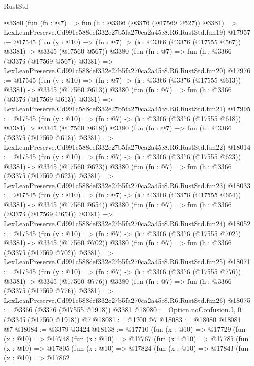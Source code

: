 \begin{lexlean}{RustStd}
\begin{coremodule}
    @3380
    (fun (fn : @7) =>
    fun (h : @3366 (@3376 (@17569 @527)) @3381) =>
    LexLeanPreserve.Cd991c588def332e27b5fa270ca2a45c8.R6.RustStd.fun19)
@17957 := @17545
    (fun (y : @10) => (fn : @7) -> (h : @3366 (@3376 (@17555 @567)) @3381) -> @3345 (@17560 @567))
    @3380
    (fun (fn : @7) =>
    fun (h : @3366 (@3376 (@17569 @567)) @3381) =>
    LexLeanPreserve.Cd991c588def332e27b5fa270ca2a45c8.R6.RustStd.fun20)
@17976 := @17545
    (fun (y : @10) => (fn : @7) -> (h : @3366 (@3376 (@17555 @613)) @3381) -> @3345 (@17560 @613))
    @3380
    (fun (fn : @7) =>
    fun (h : @3366 (@3376 (@17569 @613)) @3381) =>
    LexLeanPreserve.Cd991c588def332e27b5fa270ca2a45c8.R6.RustStd.fun21)
@17995 := @17545
    (fun (y : @10) => (fn : @7) -> (h : @3366 (@3376 (@17555 @618)) @3381) -> @3345 (@17560 @618))
    @3380
    (fun (fn : @7) =>
    fun (h : @3366 (@3376 (@17569 @618)) @3381) =>
    LexLeanPreserve.Cd991c588def332e27b5fa270ca2a45c8.R6.RustStd.fun22)
@18014 := @17545
    (fun (y : @10) => (fn : @7) -> (h : @3366 (@3376 (@17555 @623)) @3381) -> @3345 (@17560 @623))
    @3380
    (fun (fn : @7) =>
    fun (h : @3366 (@3376 (@17569 @623)) @3381) =>
    LexLeanPreserve.Cd991c588def332e27b5fa270ca2a45c8.R6.RustStd.fun23)
@18033 := @17545
    (fun (y : @10) => (fn : @7) -> (h : @3366 (@3376 (@17555 @654)) @3381) -> @3345 (@17560 @654))
    @3380
    (fun (fn : @7) =>
    fun (h : @3366 (@3376 (@17569 @654)) @3381) =>
    LexLeanPreserve.Cd991c588def332e27b5fa270ca2a45c8.R6.RustStd.fun24)
@18052 := @17545
    (fun (y : @10) => (fn : @7) -> (h : @3366 (@3376 (@17555 @702)) @3381) -> @3345 (@17560 @702))
    @3380
    (fun (fn : @7) =>
    fun (h : @3366 (@3376 (@17569 @702)) @3381) =>
    LexLeanPreserve.Cd991c588def332e27b5fa270ca2a45c8.R6.RustStd.fun25)
@18071 := @17545
    (fun (y : @10) => (fn : @7) -> (h : @3366 (@3376 (@17555 @776)) @3381) -> @3345 (@17560 @776))
    @3380
    (fun (fn : @7) =>
    fun (h : @3366 (@3376 (@17569 @776)) @3381) =>
    LexLeanPreserve.Cd991c588def332e27b5fa270ca2a45c8.R6.RustStd.fun26)
@18075 := @3366 (@3376 (@17555 @1918)) @3381
@18080 := Option.noConfusion.{0, 0} (@3345 (@17560 @1918)) @7
@18081 := @1200 @7
@18083 := @18080 @18081 @7
@18084 := @3379 @3424
@18138 := @17710
    (fun (x : @10) =>
    @17729
      (fun (x : @10) =>
      @17748
        (fun (x : @10) =>
        @17767
          (fun (x : @10) =>
          @17786
            (fun (x : @10) =>
            @17805
              (fun (x : @10) =>
              @17824
                (fun (x : @10) =>
                @17843
                  (fun (x : @10) =>
                  @17862

\end{coremodule}
\end{lexlean}
